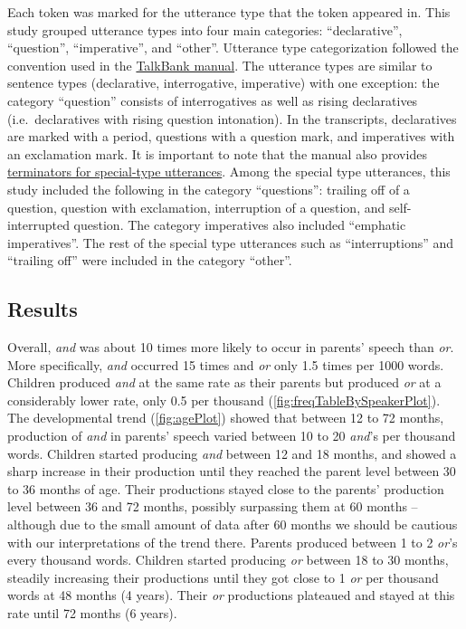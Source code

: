 \documentclass[,man,floatsintext]{apa6}
\begin{document}
Each token was marked for the utterance type that the token appeared in. This study grouped utterance types into four main categories: \enquote{declarative}, \enquote{question}, \enquote{imperative}, and \enquote{other}. Utterance type categorization followed the convention used in the \href{https://talkbank.org/manuals/CHAT.html\#_Toc486414422}{TalkBank manual}. The utterance types are similar to sentence types (declarative, interrogative, imperative) with one exception: the category \enquote{question} consists of interrogatives as well as rising declaratives (i.e.~declaratives with rising question intonation). In the transcripts, declaratives are marked with a period, questions with a question mark, and imperatives with an exclamation mark. It is important to note that the manual also provides \href{https://talkbank.org/manuals/CHAT.html\#_Toc486414431}{terminators for special-type utterances}. Among the special type utterances, this study included the following in the category \enquote{questions}: trailing off of a question, question with exclamation, interruption of a question, and self-interrupted question. The category imperatives also included \enquote{emphatic imperatives}. The rest of the special type utterances such as \enquote{interruptions} and \enquote{trailing off} were included in the category \enquote{other}.

\hypertarget{study1results}{%
\subsection{Results}\label{study1results}}

Overall, \emph{and} was about 10 times more likely to occur in parents' speech than \emph{or}. More specifically, \emph{and} occurred 15 times and \emph{or} only 1.5 times per 1000 words. Children produced \emph{and} at the same rate as their parents but produced \emph{or} at a considerably lower rate, only 0.5 per thousand (\ref{fig:freqTableBySpeakerPlot}). The developmental trend (\ref{fig:agePlot}) showed that between 12 to 72 months, production of \emph{and} in parents' speech varied between 10 to 20 \emph{and}'s per thousand words. Children started producing \emph{and} between 12 and 18 months, and showed a sharp increase in their production until they reached the parent level between 30 to 36 months of age. Their productions stayed close to the parents' production level between 36 and 72 months, possibly surpassing them at 60 months -- although due to the small amount of data after 60 months we should be cautious with our interpretations of the trend there. Parents produced between 1 to 2 \emph{or}'s every thousand words. Children started producing \emph{or} between 18 to 30 months, steadily increasing their productions until they got close to 1 \emph{or} per thousand words at 48 months (4 years). Their \emph{or} productions plateaued and stayed at this rate until 72 months (6 years).
\end{document}
